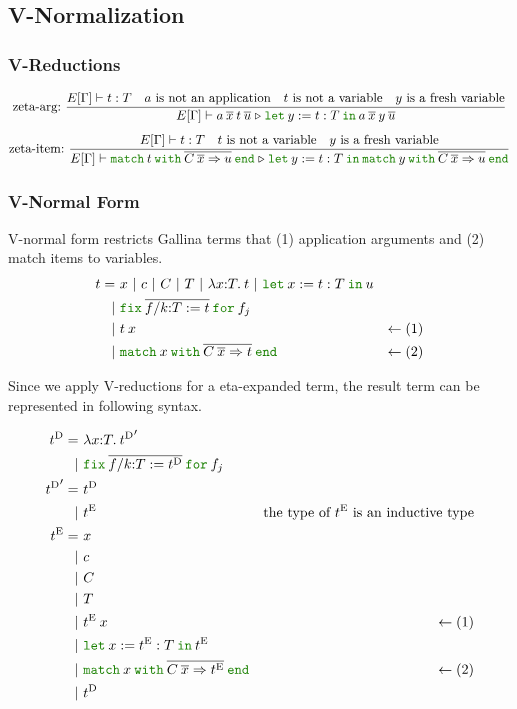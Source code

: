 \documentclass[a4paper,fleqn]{article}
\def\gallina{\textrm{Gallina}}
\newcommand{\kwlet}{\mbox{\color{mygreen}\ttfamily let}}
\newcommand{\kwin}{\mbox{\color{mygreen}\ttfamily in}}
\newcommand{\kwmatch}{\mbox{\color{mygreen}\ttfamily match}}
\newcommand{\kwwith}{\mbox{\color{mygreen}\ttfamily with}}
\newcommand{\kwend}{\mbox{\color{mygreen}\ttfamily end}}
\newcommand{\kwfix}{\mbox{\color{mygreen}\ttfamily fix}}
\newcommand{\kwfor}{\mbox{\color{mygreen}\ttfamily for}}
\newcommand{\lamT}[3]{\lambda #1\mathord{:}#2.\:#3}
\newcommand{\letin}[3]{\kwlet\:#1:=#2\:\kwin\:#3}
\newcommand{\omatch}[2]{\kwmatch\:#1\:\kwwith\:{#2}\:\kwend}
\newcommand{\ofix}[2]{\kwfix\:{#1}\:\kwfor\:{#2}}
\newcommand{\tD}{{t^\mathrm{D}}}
\newcommand{\tE}{{t^\mathrm{E}}}
\newcommand{\breakrule}{\\[0.5em]}
\newcommand{\reltri}{\mathrel{\triangleright}}
\begin{document}
\subsection{V-Normalization}\label{sec:v-normalization}
\subsubsection{V-Reductions}\label{sec:v-reductions}
\begin{gather*}
  \text{zeta-arg:}~
    \dfrac
    {
      E[\Gamma] \vdash t : T \quad
      \text{$a$ is not an application} \quad
      \text{$t$ is not a variable} \quad
      \text{$y$ is a fresh variable}
    }{
      E[\Gamma] \vdash
      a\:\overline{x}\:t\:\overline{u}
      \reltri
      \letin{y}{t:T}{a\:\overline{x}\:y\:\overline{u}}
    } \breakrule
  \text{zeta-item:}~
    \dfrac
    {
      E[\Gamma] \vdash t : T \quad
      \text{$t$ is not a variable} \quad
      \text{$y$ is a fresh variable}
    }{
      E[\Gamma] \vdash
        \omatch{t}{\overline{C\:\overline{x} \Rightarrow u}}
        \reltri
        \letin{y}{t:T}{\omatch{y}{\overline{C\:\overline{x} \Rightarrow u}}}
    }
\end{gather*}

\subsubsection{V-Normal Form}\label{sec:v-normal-form}
V-normal form restricts \gallina{} terms that (1) application arguments and (2) match items to variables.
\begin{align*}
  t =&\ x~|~c~|~C~|~T~|~\lamT{x}{T}{t}~|~ \letin{x}{t:T}{u} \\
    |&\ \ofix{\overline{f/k{:}T:=t}}{f_j} \\
    |&\ t\:x                               & \leftarrow (1) \\
    |&\ \omatch{x}{\overline{C\:\overline{x} \Rightarrow t}} & \leftarrow (2)
\end{align*}

Since we apply V-reductions for a eta-expanded term,
the result term can be represented in following syntax.

\begin{align*}
  \tD =&\ \lamT{x}{T}{\tD'} \\
      |&\ \ofix{\overline{f/k{:}T:=\tD}}{f_j} \\
  \tD' =&\ \tD \\
       |&\ \tE & \text{the type of $\tE$ is an inductive type} \\
  \tE =&\ x \\
    |&\ c \\
    |&\ C \\
    |&\ T \\
    |&\ \tE\:x & \leftarrow (1) \\
    |&\ \letin{x}{\tE:T}{\tE} \\
    |&\ \omatch{x}{\overline{C\:\overline{x}\Rightarrow \tE}} & \leftarrow (2) \\
    |&\ \tD \\
\end{align*}
\end{document}
